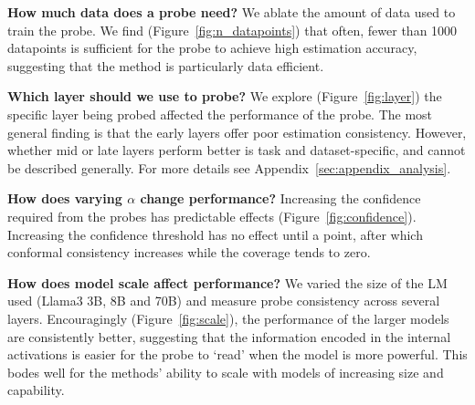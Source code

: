 

\noindent\textbf{How much data does a probe need?} We ablate the amount of data used to train the probe. We find (Figure~\ref{fig:n_datapoints}) that often, fewer than 1000 datapoints is sufficient for the probe to achieve high estimation accuracy, suggesting that the method is particularly data efficient. 



\noindent\textbf{Which layer should we use to probe?} We explore (Figure~\ref{fig:layer}) the specific layer being probed affected the performance of the probe. The most general finding is that the early layers offer poor estimation consistency. However, whether mid or late layers perform better is task and dataset-specific, and cannot be described generally. For more details see Appendix~\ref{sec:appendix_analysis}. 



\noindent\textbf{How does varying $\alpha$ change performance?} Increasing the confidence required from the probes has predictable effects (Figure~\ref{fig:confidence}). Increasing the confidence threshold has no effect until a point, after which conformal consistency increases while the coverage tends to zero.



\noindent\textbf{How does model scale affect performance?} We varied the size of the LM used (Llama3 3B, 8B and 70B) and measure probe consistency across several layers. Encouragingly (Figure~\ref{fig:scale}), the performance of the larger models are consistently better, suggesting that the information encoded in the internal activations is easier for the probe to `read' when the model is more powerful. This bodes well for the methods' ability to scale with models of increasing size and capability. 



